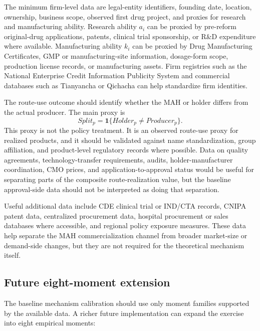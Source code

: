 \documentclass[12pt]{article}
\newcommand{\1}{\mathbf{1}}
\begin{document}
The minimum firm-level data are legal-entity identifiers, founding date, location, ownership, business scope, observed first drug project, and proxies for research and manufacturing ability. Research ability $a_i$ can be proxied by pre-reform original-drug applications, patents, clinical trial sponsorship, or R\&D expenditure where available. Manufacturing ability $k_i$ can be proxied by Drug Manufacturing Certificates, GMP or manufacturing-site information, dosage-form scope, production license records, or manufacturing assets. Firm registries such as the National Enterprise Credit Information Publicity System and commercial databases such as Tianyancha or Qichacha can help standardize firm identities.

The route-use outcome should identify whether the MAH or holder differs from the actual producer. The main proxy is
\begin{equation}
    Split_p=\1\{Holder_p\ne Producer_p\}.
    \label{eq:split}
\end{equation}
This proxy is not the policy treatment. It is an observed route-use proxy for realized products, and it should be validated against name standardization, group affiliation, and product-level regulatory records where possible. Data on quality agreements, technology-transfer requirements, audits, holder-manufacturer coordination, CMO prices, and application-to-approval status would be useful for separating parts of the composite route-realization value, but the baseline approval-side data should not be interpreted as doing that separation.

Useful additional data include CDE clinical trial or IND/CTA records, CNIPA patent data, centralized procurement data, hospital procurement or sales databases where accessible, and regional policy exposure measures. These data help separate the MAH commercialization channel from broader market-size or demand-side changes, but they are not required for the theoretical mechanism itself.

\subsection{Future eight-moment extension}

The baseline mechanism calibration should use only moment families supported by the available data. A richer future implementation can expand the exercise into eight empirical moments:
\end{document}
